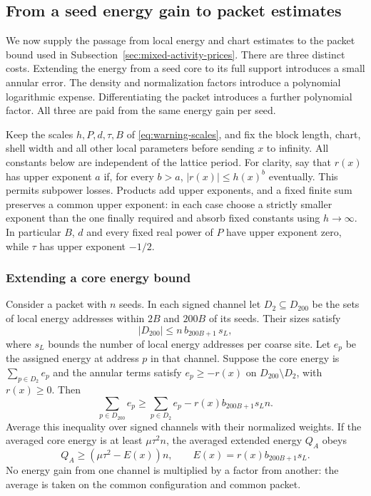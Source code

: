 \subsection{From a seed energy gain to packet estimates}
\label{sec:packet-estimates}
We now supply the passage from local energy and chart estimates to the
packet bound used in Subsection~\ref{sec:mixed-activity-prices}. There are
three distinct costs. Extending the energy from a seed core to its full
support introduces a small annular error. The density and normalization
factors introduce a polynomial logarithmic expense. Differentiating the
packet introduces a further polynomial factor. All three are paid from
the same energy gain per seed.

Keep the scales $h,P,d,\tau,B$ of
\eqref{eq:warning-scales}, and fix the block length, chart, shell width
and all other local parameters before sending $x$ to infinity. All
constants below are independent of the lattice period. For clarity,
say that $r(x)$ has upper exponent $a$ if, for every $b>a$,
$|r(x)|\le h(x)^b$ eventually. This permits subpower losses. Products
add upper exponents, and a fixed finite sum preserves a common upper
exponent: in each case choose a strictly smaller exponent than the
one finally required and absorb fixed constants using $h\to\infty$.
In particular $B$, $d$ and every fixed real power of $P$ have upper
exponent zero, while $\tau$ has upper exponent $-1/2$.

\subsubsection{Extending a core energy bound}
Consider a packet with $n$ seeds. In each signed channel let
$D_2\subseteq D_{200}$ be the sets of local energy addresses within
$2B$ and $200B$ of its seeds. Their sizes satisfy
\[
 |D_{200}|\le n\,b_{200B+1}\,s_L,
\]
where $s_L$ bounds the number of local energy addresses per coarse
site. Let $e_p$ be the assigned energy at address $p$ in that channel.
Suppose the core energy is $\sum_{p\in D_2}e_p$ and the annular terms
satisfy $e_p\ge-r(x)$ on $D_{200}\setminus D_2$, with $r(x)\ge0$.
Then
\[
 \sum_{p\in D_{200}}e_p
 \ge\sum_{p\in D_2}e_p-r(x)b_{200B+1}s_L n.
\]
Average this inequality over signed channels with their normalized
weights. If the averaged core energy is at least $\mu\tau^2n$, the
averaged extended energy $Q_A$ obeys
\begin{equation}\label{eq:packet-assigned-energy}
 Q_A\ge(\mu\tau^2-E(x))n,
 \qquad E(x)=r(x)b_{200B+1}s_L.
\end{equation}
No energy gain from one channel is multiplied by a factor from another:
the average is taken on the common configuration and common packet.

